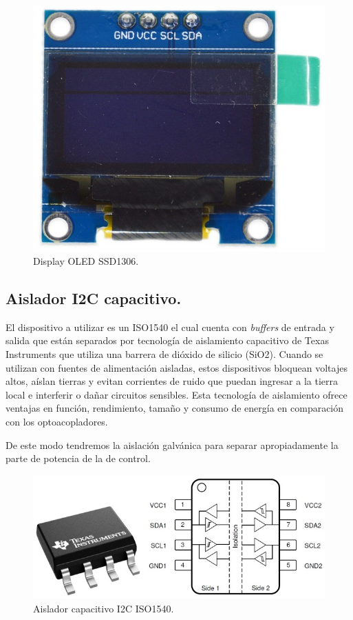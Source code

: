 \begin{figure}[H]
    \centering 
    \includegraphics[scale=0.3]{./imagenes/display.jpg}
    \caption{Display OLED SSD1306.}
    \label{F:display}
\end{figure}\par 

\subsection{Aislador I2C capacitivo.}
El dispositivo a utilizar es un ISO1540 \cite{ISO1540} el cual cuenta con \textit{buffers} de entrada y salida que están separados por tecnología de aislamiento capacitivo de Texas Instruments que utiliza una barrera de dióxido de silicio (SiO2). Cuando se utilizan con fuentes de alimentación aisladas, estos dispositivos bloquean voltajes altos, aíslan tierras y evitan corrientes de ruido que puedan ingresar a la tierra local e interferir o dañar circuitos sensibles. Esta tecnología de aislamiento ofrece ventajas en función, rendimiento, tamaño y consumo de energía en comparación con los optoacopladores. \par 
De este modo tendremos la aislación galvánica para separar apropiadamente la parte de potencia de la de control.\par 
\begin{figure}[H]
    \centering
    \includegraphics[scale=0.5]{./imagenes/optoi2c.jpg}
    \caption{Aislador capacitivo I2C ISO1540.}
    \label{F:optoi2c}
\end{figure}\par 


